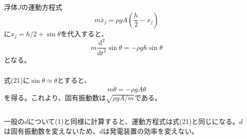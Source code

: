 \documentclass[a4paper]{jsarticle}
\begin{document}
\subsubsection{}
浮体$J$の運動方程式
\begin{equation}
  m \ddot{x_j} = \rho g A \left(\frac{h}{2} - x_j\right)
\end{equation}
に$x_j = h/2 + \sin \theta$を代入すると、
\begin{equation}
  m \frac{\mathrm{d^2}}{\mathrm{d} t^2} \sin \theta = - \rho g h \sin \theta
\end{equation}
となる。

\subsubsection{}
式(21)に$\sin \theta \simeq \theta$とすると、 
\begin{equation}
  m \ddot{\theta} = - \rho g A \theta
\end{equation}
を得る。これより、固有振動数は$\sqrt{\rho g A / m}$である。

\subsection{}
一般の$d$について(1)と同様に計算すると、運動方程式は式(21)と同じになる。$d$は固有振動数を変えないため、$d$は発電装置の効率を変えない。
\end{document}
